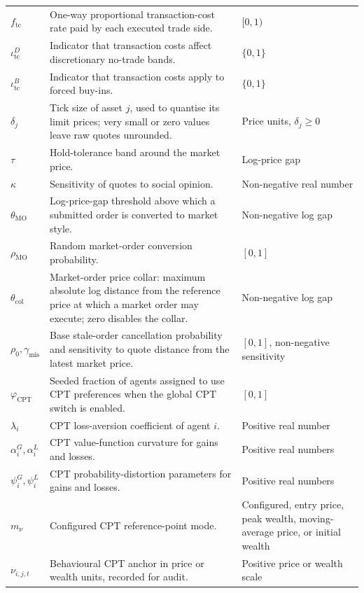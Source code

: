 \documentclass[12pt, a4paper]{article}
\begin{document}
\begin{longtable}{@{}L{0.22\textwidth}L{0.50\textwidth}L{0.20\textwidth}@{}}
        \(f_{\mathrm{tc}}\) & One-way proportional transaction-cost rate paid by each executed trade side. & \([0,1)\) \\
        \(\iota_{\mathrm{tc}}^D\) & Indicator that transaction costs affect discretionary no-trade bands. & \(\{0,1\}\) \\
        \(\iota_{\mathrm{tc}}^B\) & Indicator that transaction costs apply to forced buy-ins. & \(\{0,1\}\) \\
        \(\delta_j\) & Tick size of asset \(j\), used to quantise its limit prices; very small or zero values leave raw quotes unrounded. & Price units, \(\delta_j\ge0\) \\
        \(\tau\) & Hold-tolerance band around the market price. & Log-price gap \\
        \(\kappa\) & Sensitivity of quotes to social opinion. & Non-negative real number \\
        \(\theta_{\mathrm{MO}}\) & Log-price-gap threshold above which a submitted order is converted to market style. & Non-negative log gap \\
        \(\rho_{\mathrm{MO}}\) & Random market-order conversion probability. & \([0,1]\) \\
        \(\theta_{\mathrm{col}}\) & Market-order price collar: maximum absolute log distance from the reference price at which a market order may execute; zero disables the collar. & Non-negative log gap \\
        \(\rho_0,\gamma_{\mathrm{mis}}\) & Base stale-order cancellation probability and sensitivity to quote distance from the latest market price. & \([0,1]\), non-negative sensitivity \\
        \(\varphi_{\mathrm{CPT}}\) & Seeded fraction of agents assigned to use CPT preferences when the global CPT switch is enabled. & \([0,1]\) \\
        \(\lambda_i\) & CPT loss-aversion coefficient of agent \(i\). & Positive real number \\
        \(\alpha_i^G,\alpha_i^L\) & CPT value-function curvature for gains and losses. & Positive real numbers \\
        \(\psi_i^G,\psi_i^L\) & CPT probability-distortion parameters for gains and losses. & Positive real numbers \\
        \(m_{\nu}\) & Configured CPT reference-point mode. & Configured, entry price, peak wealth, moving-average price, or initial wealth \\
        \(\nu_{i,j,t}\) & Behavioural CPT anchor in price or wealth units, recorded for audit. & Positive price or wealth scale \\

\end{longtable}
\end{document}
